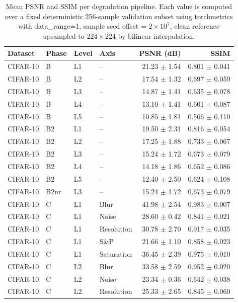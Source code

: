 \begin{table}[htbp]
\centering
\caption{Mean PSNR and SSIM per degradation pipeline. Each value is computed over a fixed deterministic 256-sample validation subset using torchmetrics with data\_range=1, sample seed offset = $2 \times 10^{7}$, clean reference upsampled to $224 \times 224$ by bilinear interpolation.}
\label{tab:pipelines}
\setlength{\tabcolsep}{4pt}
\renewcommand{\arraystretch}{1.1}
\begin{tabular}{llllrr}
\toprule
Dataset & Phase & Level & Axis & PSNR (dB) & SSIM \\
\midrule
CIFAR-10 & B & L1 & -- & 21.23 $\pm$ 1.54 & 0.801 $\pm$ 0.041 \\
CIFAR-10 & B & L2 & -- & 17.54 $\pm$ 1.32 & 0.697 $\pm$ 0.059 \\
CIFAR-10 & B & L3 & -- & 14.87 $\pm$ 1.41 & 0.635 $\pm$ 0.078 \\
CIFAR-10 & B & L4 & -- & 13.10 $\pm$ 1.41 & 0.601 $\pm$ 0.087 \\
CIFAR-10 & B & L5 & -- & 10.85 $\pm$ 1.81 & 0.566 $\pm$ 0.110 \\
CIFAR-10 & B2 & L1 & -- & 19.50 $\pm$ 2.31 & 0.816 $\pm$ 0.054 \\
CIFAR-10 & B2 & L2 & -- & 17.25 $\pm$ 1.88 & 0.733 $\pm$ 0.067 \\
CIFAR-10 & B2 & L3 & -- & 15.24 $\pm$ 1.72 & 0.673 $\pm$ 0.079 \\
CIFAR-10 & B2 & L4 & -- & 14.18 $\pm$ 1.86 & 0.652 $\pm$ 0.086 \\
CIFAR-10 & B2 & L5 & -- & 12.40 $\pm$ 2.50 & 0.624 $\pm$ 0.108 \\
CIFAR-10 & B2nr & L3 & -- & 15.24 $\pm$ 1.72 & 0.673 $\pm$ 0.079 \\
CIFAR-10 & C & L1 & Blur & 41.98 $\pm$ 2.54 & 0.983 $\pm$ 0.007 \\
CIFAR-10 & C & L1 & Noise & 28.60 $\pm$ 0.42 & 0.841 $\pm$ 0.021 \\
CIFAR-10 & C & L1 & Resolution & 30.78 $\pm$ 2.70 & 0.917 $\pm$ 0.035 \\
CIFAR-10 & C & L1 & S\&P & 21.66 $\pm$ 1.10 & 0.858 $\pm$ 0.023 \\
CIFAR-10 & C & L1 & Saturation & 36.45 $\pm$ 2.39 & 0.975 $\pm$ 0.010 \\
CIFAR-10 & C & L2 & Blur & 33.58 $\pm$ 2.59 & 0.952 $\pm$ 0.020 \\
CIFAR-10 & C & L2 & Noise & 23.34 $\pm$ 0.36 & 0.642 $\pm$ 0.038 \\
CIFAR-10 & C & L2 & Resolution & 25.33 $\pm$ 2.65 & 0.845 $\pm$ 0.060 \\

\end{tabular}
\end{table}
